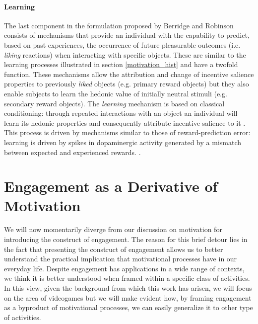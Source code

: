 \paragraph*{Learning}
\label{learning}
The last component in the formulation proposed by Berridge and Robinson \cite{berridge1998role,berridge2004motivation} consists of mechanisms that provide an individual with the capability to predict, based on past experiences, the occurrence of future pleasurable outcomes (i.e. \emph{liking} reactions) when interacting with specific objects. These are similar to the learning processes illustrated in section \ref{motivation_hist} and have a twofold function. These mechanisms allow the attribution and change of incentive salience properties to previously \emph{liked} objects (e.g. primary reward objects) but they also enable subjects to learn the hedonic value of initially neutral stimuli (e.g. secondary reward objects). The \emph{learning} mechanism is based on classical conditioning: through repeated interactions with an object an individual will learn its hedonic properties and consequently attribute incentive salience to it \cite{berridge2004motivation,berridge2009dissecting}. This process is driven by mechanisms similar to those of reward-prediction error: learning is driven by spikes in dopaminergic activity generated by a mismatch between expected and experienced rewards. \cite{schultz1997neural,schultz2000multiple,flagel2011selective}.

\section{Engagement as a Derivative of Motivation}
\label{engagement}
We will now momentarily diverge from our discussion on motivation for introducing the construct of engagement. The reason for this brief detour lies in the fact that presenting the construct of engagement allows us to better understand the practical implication that motivational processes have in our everyday life. Despite engagement has applications in a wide range of contexts, we think it is better understood when framed within a specific class of activities. In this view, given the background from which this work has arisen, we will focus on the area of videogames but we will make evident how, by framing engagement as a byproduct of motivational processes, we can easily generalize it to other type of activities.

